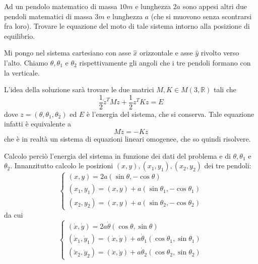 \documentclass[../main.tex]{subfiles}
\begin{document}
\label{ex:pap}

\textex
Ad un pendolo matematico di massa $10m$ e lunghezza $2a$ sono appesi altri due pendoli matematici di massa $3m$ e lunghezza $a$ (che si muovono senza scontrarsi fra loro). Trovare le equazione del moto di tale sistema intorno alla posizione di equilibrio.

\solution
Mi pongo nel sistema cartesiano con asse $\hat x$ orizzontale e asse $\hat y$ rivolto verso l'alto. Chiamo $\theta,\theta_1$ e $\theta_2$ rispettivamente gli angoli che i tre pendoli formano con la verticale.

L'idea della soluzione sarà trovare le due matrici $M,K\in M(3,\mathbb{R})$ tali che
\begin{equation*}
	\frac 12 \dot z^TM\dot z+\frac 12 z^TKz=E
\end{equation*}
dove $z=(\theta,\theta_1,\theta_2)$ ed $E$ è l'energia del sistema, che si conserva. Tale equazione infatti è equivalente a 
\begin{equation*}
	M\ddot z=-Kz
\end{equation*}
che è in realtà un sistema di equazioni lineari omogenee, che so quindi risolvere.

Calcolo perciò l'energia del sistema in funzione dei dati del problema e di $\theta,\theta_1$ e $\theta_2$.
Innanzitutto calcolo le posizioni $(x,y), (x_1,y_1), (x_2,y_2)$ dei tre pendoli:
\begin{equation*}
\begin{cases}
	(x,y)=2a(\sin\theta,-\cos\theta)\\
	(x_1,y_1)=(x,y)+a(\sin\theta_1,-\cos\theta_1)\\
	(x_2,y_2)=(x,y)+a(\sin\theta_2,-\cos\theta_2)
\end{cases}
\end{equation*}
da cui
\begin{equation*}
\begin{cases}
	(\dot x,\dot y)=2a\dot \theta(\cos\theta,\sin\theta)\\
	(\dot x_1,\dot y_1)=(\dot x,\dot y)+a\dot \theta_1(\cos\theta_1,\sin\theta_1)\\
	(\dot x_2,\dot y_2)=(\dot x,\dot y)+a\dot \theta_2(\cos\theta_2,\sin\theta_2)
\end{cases}
\end{equation*}
\end{document}
